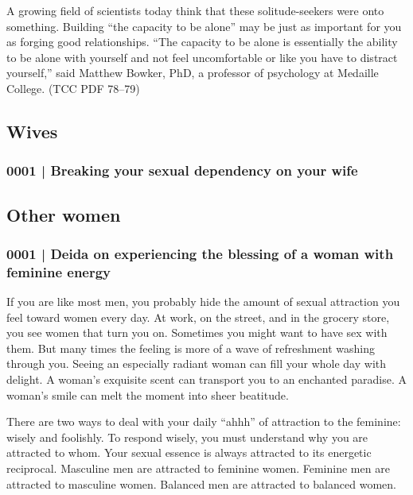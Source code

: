 			A growing field of scientists today think that these solitude-seekers were onto something. Building ``the capacity to be alone'' may be just as important for you as forging good relationships. ``The capacity to be alone is essentially the ability to be alone with yourself and not feel uncomfortable or like you have to distract yourself,'' said Matthew Bowker, PhD, a professor of psychology at Medaille College. (TCC PDF 78--79)
	
	\subsection{Wives} %
		\label{TTW-WOMEN-WIVES}
		
		\subsubsection{0001 | Breaking your sexual dependency on your wife}
			\label{TTW-WOMEN-WIVES-0001}
		
	\subsection{Other women} %
		\label{TTW-WOMEN-OTHERS}
		
		\subsubsection{0001 | Deida on experiencing the blessing of a woman with feminine energy}
			\label{TTW-WOMEN-OTHERS-0001}
			
			If you are like most men, you probably hide the amount of sexual attraction you feel toward women every day. At work, on the street, and in the grocery store, you see women that turn you on. Sometimes you might want to have sex with them. But many times the feeling is more of a wave of refreshment washing through you. Seeing an especially radiant woman can fill your whole day with delight. A woman's exquisite scent can transport you to an enchanted paradise. A woman's smile can melt the moment into sheer beatitude. 

			There are two ways to deal with your daily ``ahhh'' of attraction to the feminine: wisely and foolishly. To respond wisely, you must understand why you are attracted to whom. Your sexual essence is always attracted to its energetic reciprocal. Masculine men are attracted to feminine women. Feminine men are attracted to masculine women. Balanced men are attracted to balanced women. 


